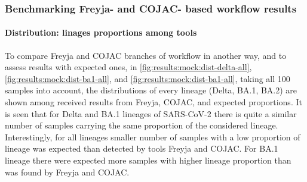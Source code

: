         \subsubsection{Benchmarking Freyja- and COJAC- based workflow results}
        \paragraph{Distribution: linages proportions among tools}
        To compare Freyja and COJAC branches of workflow in another way, and to assess results with expected ones, in \cref{fig:results:mock:dist-delta-all}, \ref{fig:results:mock:dist-ba1-all}, and \ref{fig:results:mock:dist-ba1-all}, taking all 100 samples into account, the distributions of every lineage (Delta, BA.1, BA.2) are shown among received results from Freyja, COJAC, and expected proportions. It is seen that for Delta and BA.1 lineages of SARS-CoV-2 there is quite a similar number of samples carrying the same proportion of the considered lineage. Interestingly, for all lineages smaller number of samples with a low proportion of lineage was expected than detected by tools Freyja and COJAC. For BA.1 lineage there were expected more samples with higher lineage proportion than was found by Freyja and COJAC. 
